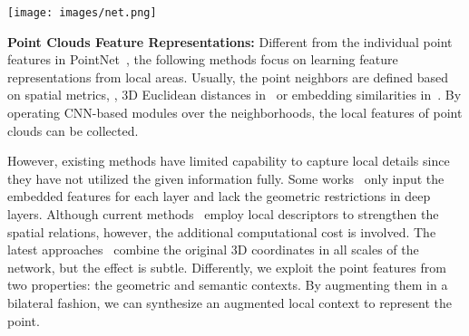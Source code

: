 \documentclass[10pt,twocolumn,letterpaper]{article}
\def\ourencoder{Bilateral Context Module}
\def\ourblock{Bilateral Context Block}
\def\ourblocks{Bilateral Context Blocks}
\def\ourdecoder{Adaptive Fusion Module}
\begin{document}
\begin{figure*}
\begin{center}
\texttt{[image: images/net.png]}
\end{center}
\vspace{-5mm}
\captionsetup{font=small}
\caption{The details of our semantic segmentation network and the Bilateral Context Block (the annotations are consistent with the items in Sec.~\ref{sec:metho_cross}). Firstly, the Feature Extractor (Sec.~\ref{sec:impl_extractor}) captures the preliminary semantic context  from the input data. Then, the \ourencoder~(\ie, a series of the \ourblocks) augments the local context of multiple point cloud resolutions. Generally, the \ourblock~requires both semantic and geometric context as bilateral inputs. In particular, the first block inputs the preliminary  and the original 3D coordinates ; while each of the others inputs its previous one's downsampled output and coordinates , as the semantic and geometric context respectively. Afterward, our \ourdecoder~(Sec.~\ref{sec:metho_fuse}) upsamples the \ourblocks' outputs, then adaptively fuses them as an output feature map. Finally, we predict semantic labels for all points via fully-connected layers.}
\label{fig:net}
\vspace{-3mm}
\end{figure*}
\vspace{1mm}
\noindent \textbf{Point Clouds Feature Representations:} 
Different from the individual point features in PointNet~\cite{qi2017pointnet}, the following methods focus on learning feature representations from local areas. Usually, the point neighbors are defined based on spatial metrics, \eg, 3D Euclidean distances in~\cite{qi2017pointnet++, liu2019relation, yan2020pointasnl, hu2020randla} or embedding similarities in~\cite{wang2019dynamic, qiu2019geometric, qiu2021dense}. By operating CNN-based modules over the neighborhoods, the local features of point clouds can be collected.

However, existing methods have limited capability to capture local details since they have not utilized the given information fully. Some works~\cite{qi2017pointnet, qi2017pointnet++, wang2019dynamic} only input the embedded features for each layer and lack the geometric restrictions in deep layers. Although current methods~\cite{liu2019relation,qiu2019geometric} employ local descriptors to strengthen the spatial relations, however, the additional computational cost is involved. The latest approaches~\cite{yan2020pointasnl, hu2020randla} combine the original 3D coordinates in all scales of the network, but the effect is subtle. Differently, we exploit the point features from two properties: the geometric and semantic contexts. By augmenting them in a bilateral fashion, we can synthesize an augmented local context to represent the point. 
\end{document}
